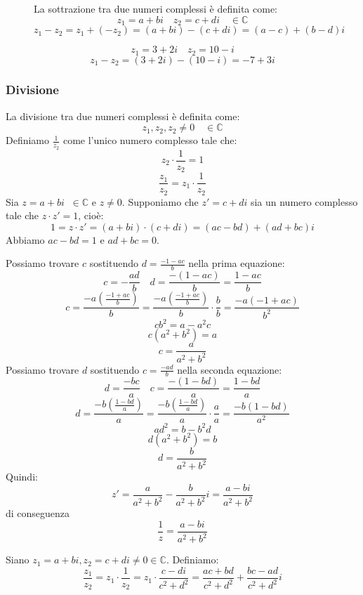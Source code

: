 \documentclass[a4paper]{article}
\theoremstyle{break}
\theoremstyle{break}
\theoremstyle{break}
\theoremstyle{break}
\begin{document}
\begin{figure}[H]
	\begin{definition}
		La sottrazione tra due numeri complessi è definita come:
		\[
			z_1 = a + bi \quad z_2 = c + di \quad \in \mathbb{C}
		\]
		\[
			z_1 - z_2 = z_1 + (-z_2) = (a + bi) - (c + di) = (a - c) + (b - d)i
		\]
	\end{definition}

	\begin{example}
		\[
			z_1 = 3 + 2i \quad z_2 = 10 - i
		\]
		\[
			z_1 - z_2 = (3 + 2i) - (10 - i) = -7 + 3i
		\]
	\end{example}
\end{figure}

\subsubsection{Divisione}
\begin{definition}
	La divisione tra due numeri complessi è definita come:
	\[
		z_1, z_2, z_2 \neq 0 \quad \in \mathbb{C}
	\]
	Definiamo \( \frac{1}{z_2} \) come l'unico numero complesso tale che:
	\[
		z_2 \cdot \frac{1}{z_2} = 1
	\]
	\[
		\frac{z_1}{z_2} = z_1 \cdot \frac{1}{z_2}
	\]
	Sia \( z = a + bi\;\; \in \mathbb{C} \) e \( z \neq 0 \). Supponiamo che \( z'= c + di \) sia
	un numero complesso tale che \( z \cdot z' = 1 \), cioè:
	\[
		1 = z \cdot z' = (a + bi) \cdot (c + di) = (ac - bd) + (ad + bc)i
	\]
	Abbiamo \( ac-bd=1 \) e \( ad+bc=0 \).

	\noindent Possiamo trovare \( c \) sostituendo \( d = \frac{-1-ac}{b} \) nella prima equazione:
	\[
		c = -\frac{ad}{b} \quad d = \frac{-(1-ac)}{b} = \frac{1-ac}{b}
	\]
	\[
		c = \frac{-a (\frac{-1+ac}{b})}{b} = \frac{-a (\frac{-1+ac}{b})}{b} \cdot \frac{b}{b} = \frac{-a (-1 + ac)}{b^2}
	\]
	\[
		cb^2 = a - a^2c
	\]
	\[
		c(a^2 + b^2) = a
	\]
	\[
		c = \frac{a}{a^2 + b^2}
	\]
	\noindent Possiamo trovare \( d \) sostituendo \( c = \frac{-ad}{b} \) nella seconda equazione:
	\[
		d = \frac{-bc}{a} \quad c = \frac{-(1-bd)}{a} = \frac{1-bd}{a}
	\]
	\[
		d = \frac{-b (\frac{1-bd}{a})}{a} = \frac{-b (\frac{1-bd}{a})}{a} \cdot \frac{a}{a} = \frac{-b (1 - bd)}{a^2}
	\]
	\[
		ad^2 = b - b^2d
	\]
	\[
		d(a^2 + b^2) = b
	\]
	\[
		d = \frac{b}{a^2 + b^2}
	\]
	Quindi:
	\[
		z' = \frac{a}{a^2 + b^2} - \frac{b}{a^2 + b^2}i = \frac{a - bi}{a^2 + b^2}
	\]
	di conseguenza \[ \frac{1}{z} = \frac{a-bi}{a^2+b^2} \]

	\noindent Siano \( z_1 = a+bi, z_2 = c+di \neq 0 \in \mathbb{C} \). Definiamo:
	\[
		\frac{z_1}{z_2} = z_1 \cdot \frac{1}{z_2} = z_1 \cdot \frac{c-di}{c^2+d^2} = \frac{ac+bd}{c^2+d^2} + \frac{bc-ad}{c^2+d^2}i
	\]
\end{definition}
\end{document}
